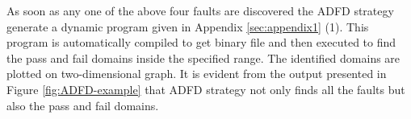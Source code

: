 As soon as any one of the above four faults are discovered the ADFD strategy generate a dynamic program given in Appendix \ref{sec:appendix1} (1). This program is automatically compiled to get binary file and then executed to find the pass and fail domains inside the specified range. The identified domains are plotted on two-dimensional graph. It is evident from the output presented in Figure \ref{fig:ADFD-example} that ADFD strategy not only finds all the faults but also the pass and fail domains.

